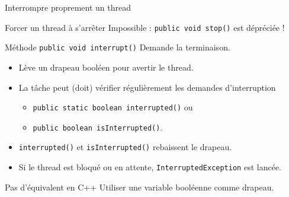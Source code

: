 
\begingroup

\begin{frame}[fragile]{Interrompre proprement un thread}

  \begin{alertblock}{Forcer un thread à s'arrêter}
  Impossible : \lstinline|public void stop()| est dépréciée !
  \end{alertblock}
  \vfill
  \begin{block}{Méthode \lstinline|public void interrupt()|}
    Demande la terminaison.
    \begin{itemize}
    \item Lève un drapeau booléen pour avertir le thread.
    \item La tâche peut (doit) vérifier régulièrement les demandes d'interruption
    \begin{itemize}
    \item \lstinline|public static boolean interrupted()| ou
    \item \lstinline|public boolean isInterrupted()|.
    \end{itemize}
  \item \lstinline|interrupted()| et \lstinline|isInterrupted()| rebaissent le drapeau.
  \item Si le thread est bloqué ou en attente,  \lstinline|InterruptedException| est lancée.
    \end{itemize}
  \end{block}
  \vfill
  \begin{exampleblock}{Pas d'équivalent en C++}
    Utiliser une variable booléenne comme drapeau.
  \end{exampleblock}
\end{frame}

\endgroup
\endinput
